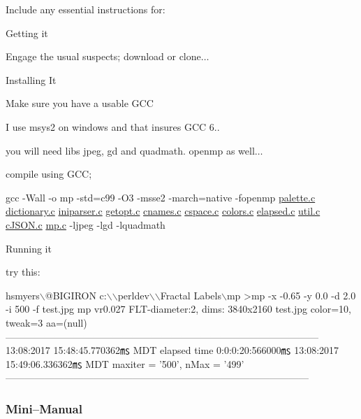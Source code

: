 Include any essential instructions for\+:
\begin{DoxyItemize}
\item Getting it
\begin{DoxyItemize}
\item Engage the usual suspects; download or clone{$\dots$}
\end{DoxyItemize}
\item Installing It
\begin{DoxyItemize}
\item Make sure you have a usable G\+CC
\item I use msys2 on windows and that insures G\+CC 6..
\item you will need libs jpeg, gd and quadmath. openmp as well{$\dots$}
\item compile using G\+CC;
\item gcc -\/\+Wall -\/o mp -\/std=c99 -\/\+O3 -\/msse2 -\/march=native -\/fopenmp \hyperlink{palette_8c}{palette.\+c} \hyperlink{dictionary_8c}{dictionary.\+c} \hyperlink{iniparser_8c}{iniparser.\+c} \hyperlink{getopt_8c}{getopt.\+c} \hyperlink{cnames_8c}{cnames.\+c} \hyperlink{cspace_8c_source}{cspace.\+c} \hyperlink{colors_8c_source}{colors.\+c} \hyperlink{elapsed_8c}{elapsed.\+c} \hyperlink{util_8c}{util.\+c} \hyperlink{c_j_s_o_n_8c_source}{c\+J\+S\+O\+N.\+c} \hyperlink{mp_8c}{mp.\+c} -\/ljpeg -\/lgd -\/lquadmath
\end{DoxyItemize}
\item Running it
\begin{DoxyItemize}
\item try this\+: 
\begin{DoxyCode}
hsmyers\(\backslash\)@BIGIRON c:\(\backslash\)\(\backslash\)perldev\(\backslash\)\(\backslash\)Fractal Labels\(\backslash\)mp
>mp -x -0.65 -y 0.0 -d 2.0 -i 500 -f test.jpg
mp vr0.027
FLT-diameter:2, dims: 3840x2160 test.jpg color=10, tweak=3 aa=(null)
————————————————————————————————
13:08:2017 15:48:45.770362㎳ MDT
elapsed time 0:0:0:20:566000㎳
13:08:2017 15:49:06.336362㎳ MDT
maxiter = '500', nMax = '499'
———————————————————————————————
\end{DoxyCode}

\end{DoxyItemize}
\end{DoxyItemize}

\subsubsection*{Mini--Manual}


